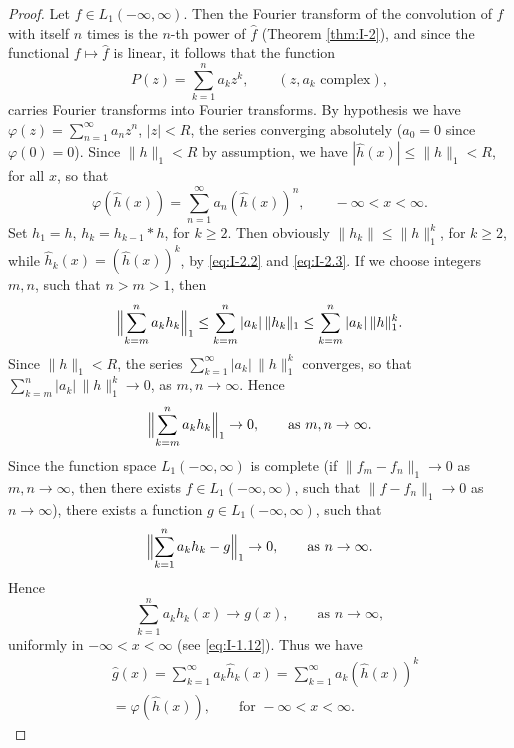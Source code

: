 \begin{proof}
Let $f\in L_1(-\infty,\infty)$. Then the Fourier transform of the convolution of $f$ with itself $n$ times is the $n$-th power of $\widehat f$ (Theorem \ref{thm:I-2}), and since the functional $f\mapsto\widehat f$ is linear, it follows that the function
\begin{equation*}
P(z)=\sum_{k=1}^{n}a_kz^k,\qquad(z,a_k\text{ complex}),
\end{equation*}
carries Fourier transforms into Fourier transforms. By hypothesis we have $\varphi(z)=\sum_{n=1}^{\infty}a_nz^n$, $|z|<R$, the series converging absolutely ($a_0=0$ since $\varphi(0)=0$). Since $\|h\|_1<R$ by assumption, we have $|\widehat h(x)|\le\|h\|_1<R$, for all $x$, so that
\begin{equation*}
\varphi(\widehat h(x))=\sum_{n=1}^{\infty}a_n(\widehat h(x))^n,\qquad-\infty<x<\infty.
\end{equation*}
Set $h_1=h$, $h_k=h_{k-1}*h$, for $k\ge 2$. Then obviously $\|h_k\|\le\|h\|_1^k$, for $k\ge 2$, while $\widehat h_k(x)=(\widehat h(x))^k$, by \eqref{eq:I-2.2} and \eqref{eq:I-2.3}. If we choose integers $m,n$, such that $n>m>1$, then
\begin{equation*}
\Bigl\|\sum_{k=m}^{n}a_kh_k\Bigr\|_1
\le\sum_{k=m}^{n}|a_k|\,\|h_k\|_1
\le\sum_{k=m}^{n}|a_k|\,\|h\|_1^k.
\end{equation*}
Since $\|h\|_1<R$, the series $\sum_{k=1}^{\infty}|a_k|\,\|h\|_1^k$ converges, so that $\sum_{k=m}^{n}|a_k|\,\|h\|_1^k\to 0$, as $m,n\to\infty$. Hence
\begin{equation*}
\Bigl\|\sum_{k=m}^{n}a_kh_k\Bigr\|_1\to 0,\qquad\text{as }m,n\to\infty.
\end{equation*}
Since the function space $L_1(-\infty,\infty)$ is complete (if $\|f_m-f_n\|_1\to 0$ as $m,n\to\infty$, then there exists $f\in L_1(-\infty,\infty)$, such that $\|f-f_n\|_1\to 0$ as $n\to\infty$), there exists a function $g\in L_1(-\infty,\infty)$, such that
\begin{equation*}
\Bigl\|\sum_{k=1}^{n}a_kh_k-g\Bigr\|_1\to 0,\qquad\text{as }n\to\infty.
\end{equation*}
Hence
\begin{equation*}
\sum_{k=1}^{n}a_kh_k(x)\to g(x),\qquad\text{as }n\to\infty,
\end{equation*}
uniformly in $-\infty<x<\infty$ (see \eqref{eq:I-1.12}). Thus we have
\begin{equation*}
\begin{aligned}
&\widehat g(x) = \sum_{k=1}^{\infty}a_k\widehat h_k(x) = \sum_{k=1}^{\infty}a_k(\widehat h(x))^k\\
&= \varphi(\widehat h(x)),  \qquad\text{for } - \infty < x < \infty.
\end{aligned}
\end{equation*}
\end{proof}

